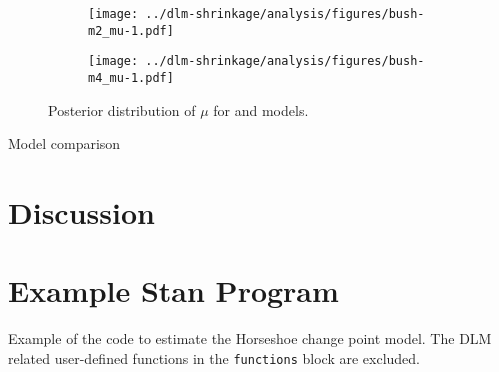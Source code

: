 \begin{figure}[thbp!]
  \begin{subfigure}[b]{\linewidth}
    \texttt{[image: ../dlm-shrinkage/analysis/figures/bush-m2\_mu-1.pdf]}
    \caption{}
  \end{subfigure}

  \begin{subfigure}[b]{\linewidth}
    \texttt{[image: ../dlm-shrinkage/analysis/figures/bush-m4\_mu-1.pdf]}
    \caption{}
  \end{subfigure}
  \caption{Posterior distribution of $\mu$ for  and  models.}
  \label{dlm:fig:bush_mu}
\end{figure}


Model comparison

\begin{table}[thbp!]
  \centering
  
  \caption{}
  \label{dlm:tab:bush_model_comp}
\end{table}



\section{Discussion}
\label{dlm:sec:discussion}








\section{Example Stan Program}
\label{dlm:sec:example-stan-program}

Example of the code to estimate the Horseshoe change point model.
The DLM related user-defined functions in the \texttt{functions} block are excluded.


\inputminted[firstline=5,style=bw]{stan}{../dlm-shrinkage/stan/changepoint_horseshoe.stan.mustache}  


